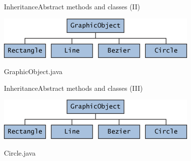\documentclass[10pt,compress]{beamer} %
\begin{document}
\begin{frame}{Inheritance}{Abstract methods and classes (II)}
	\begin{center} 
		\includegraphics[width=0.5\linewidth]{figs/classes-graphicObject.png}
	\end{center}
	\vspace{-0.2cm}
	\begin{block}{GraphicObject.java}
		\vspace{-0.2cm}
		
		\vspace{-0.2cm}
	\end{block}
\end{frame}

\begin{frame}{Inheritance}{Abstract methods and classes (III)}
	\begin{center} 
		\includegraphics[width=0.5\linewidth]{figs/classes-graphicObject.png}
	\end{center}

	\vspace{-0.2cm}
	\begin{block}{Circle.java}
		\vspace{-0.2cm}
		
		\vspace{-0.2cm}
	\end{block}


\end{frame}
\end{document}
